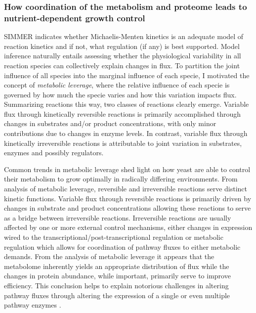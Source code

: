 \subsubsection{How coordination of the metabolism and proteome leads to nutrient-dependent growth control}

SIMMER indicates whether Michaelis-Menten kinetics is an adequate model of reaction kinetics and if not, what regulation (if any) is best supported. Model inference naturally entails assessing whether the physiological variability in all reaction species can collectively explain changes in flux. To partition the joint influence of all species into the marginal influence of each specie, I motivated the concept of \textit{metabolic leverage}, where the relative influence of each specie is governed by how much the specie varies and how this variation impacts flux. Summarizing reactions this way, two classes of reactions clearly emerge.  Variable flux through kinetically reversible reactions is primarily accomplished through changes in substrates and/or product concentrations, with only minor contributions due to changes in enzyme levels.  In contrast, variable flux through kinetically irreversible reactions is attributable to joint variation in substrates, enzymes and possibly regulators.

Common trends in metabolic leverage shed light on how yeast are able to control their metabolism to grow optimally in radically differing environments. From analysis of metabolic leverage, reversible and irreversible reactions serve distinct kinetic functions. Variable flux through reversible reactions is primarily driven by changes in substrate and product concentrations allowing these reactions to serve as a bridge between irreversible reactions. Irreversible reactions are usually affected by one or more external control mechanisms, either changes in expression wired to the transcriptional/post-transcriptional regulation or metabolic regulation which allows for coordination of pathway fluxes to either metabolic demands. From the analysis of metabolic leverage it appears that the metabolome inherently yields an appropriate distribution of flux while the changes in protein abundance, while important, primarily serve to improve efficiency. This conclusion helps to explain notorious challenges in altering pathway fluxes through altering the expression of a single or even multiple pathway enzymes \cite{CornishBowden:1995fy,Schaaff:1989dl,Hauf:2000vu,Fell:1997wg}. 

